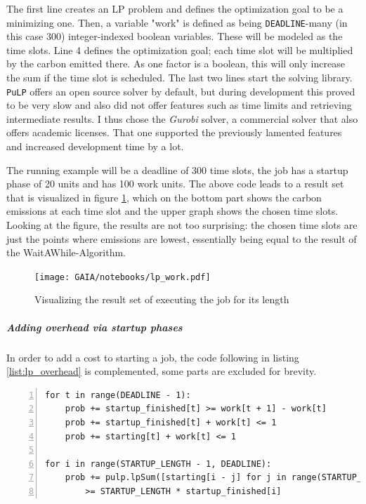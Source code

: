 The first line creates an LP problem and defines the optimization goal to be a minimizing one. 
Then, a variable "work" is defined as being \verb|DEADLINE|-many (in this case 300) integer-indexed boolean variables. 
These will be modeled as the time slots.
Line 4 defines the optimization goal; each time slot will be multiplied by the carbon emitted there. As one factor is a boolean, this will only increase the sum if the time slot is scheduled. 
The last two lines start the solving library. 
\verb|PuLP| offers an open source solver by default, but during development this proved to be very slow and also did not offer features such as time limits and retrieving intermediate results.
I thus chose the \emph{Gurobi} solver, a commercial solver that also offers academic licenses. 
That one supported the previously lamented features and increased development time by a lot. 

The running example will be a deadline of 300 time slots, the job has a startup phase of 20 units and has 100 work units. 
The above code leads to a result set that is visualized in figure \ref{fig:lp_work},
which on the bottom part shows the carbon emissions at each time slot and the upper graph shows the chosen time slots.
Looking at the figure, the results are not too surprising: the chosen time slots are just the points where emissions are lowest, essentially being equal to the result of the WaitAWhile-Algorithm.

\begin{figure}
    \texttt{[image: GAIA/notebooks/lp\_work.pdf]}
    \caption{Visualizing the result set of executing the job for its length}
    \label{fig:lp_work}
\end{figure}

\subparagraph{Adding overhead via startup phases}

In order to add a cost to starting a job, the code following in listing \ref{list:lp_overhead} is complemented, some parts are excluded for brevity.

\begin{lstlisting}[frame=single, numbers=left, caption={LP Implementation for overhead}, label={list:lp_overhead}, basicstyle=\ttfamily]
for t in range(DEADLINE - 1):
    prob += startup_finished[t] >= work[t + 1] - work[t]
    prob += startup_finished[t] + work[t] <= 1
    prob += starting[t] + work[t] <= 1

for i in range(STARTUP_LENGTH - 1, DEADLINE):
    prob += pulp.lpSum([starting[i - j] for j in range(STARTUP_LENGTH)]) 
        >= STARTUP_LENGTH * startup_finished[i]
\end{lstlisting}

